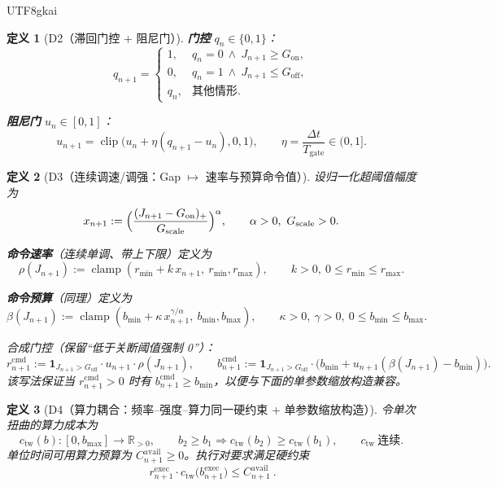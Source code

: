 \documentclass[12pt]{article}
\newtheorem{definition}{定义}[section]
\newcommand{\RR}{\mathbb{R}}
\newcommand{\indicator}[1]{\mathbf{1}_{#1}}
\newcommand{\clip}{\operatorname{clip}}
\newcommand{\clamp}{\operatorname{clamp}}
\begin{document}
\begin{CJK*}{UTF8}{gkai}
\begin{definition}[D2（滞回门控 + 阻尼门）]
\textbf{门控} $q_n\in\{0,1\}$：
\[
  q_{n+1}=
  \begin{cases}
    1,& q_n=0\ \wedge\ J_{n+1}\ge G_{\mathrm{on}},\\
    0,& q_n=1\ \wedge\ J_{n+1}\le G_{\mathrm{off}},\\
    q_n,& \text{其他情形}.
  \end{cases}
\]

\textbf{阻尼门} $u_n\in[0,1]$：
\[
  u_{n+1}=\clip\bigl(u_n+\eta(q_{n+1}-u_n),0,1\bigr),
  \qquad
  \eta=\frac{\Delta t}{T_{\mathrm{gate}}}\in(0,1].
\]
\end{definition}

\begin{definition}[D3（连续调速/调强：Gap $\mapsto$ 速率与预算命令值）]
\label{def:tex28-ch3-d3}
设归一化超阈值幅度为
\[
  x_{n+1}:=\Bigl(\frac{(J_{n+1}-G_{\mathrm{on}})_{+}}{G_{\mathrm{scale}}}\Bigr)^{\alpha},
  \qquad
  \alpha>0,\ G_{\mathrm{scale}}>0.
\]

\textbf{命令速率}（连续单调、带上下限）定义为
\[
  \rho(J_{n+1}):=\clamp(r_{\min}+k\,x_{n+1},\ r_{\min},r_{\max}),
  \qquad
  k>0,\ 0\le r_{\min}\le r_{\max}.
\]

\textbf{命令预算}（同理）定义为
\[
  \beta(J_{n+1}):=\clamp(b_{\min}+\kappa\,x_{n+1}^{\gamma/\alpha},\ b_{\min},b_{\max}),
  \qquad
  \kappa>0,\ \gamma>0,\ 0\le b_{\min}\le b_{\max}.
\]

合成门控（保留“低于关断阈值强制 0”）：
\[
  r^{\mathrm{cmd}}_{n+1}:=\indicator{J_{n+1}>G_{\mathrm{off}}}\cdot u_{n+1}\cdot \rho(J_{n+1}),
  \qquad
  b^{\mathrm{cmd}}_{n+1}:=\indicator{J_{n+1}>G_{\mathrm{off}}}\cdot\bigl(b_{\min}+u_{n+1}(\beta(J_{n+1})-b_{\min})\bigr)
    .
\]
该写法保证当 $r^{\mathrm{cmd}}_{n+1}>0$ 时有 $b^{\mathrm{cmd}}_{n+1}\ge b_{\min}$，以便与下面的单参数缩放构造兼容。
\end{definition}

\begin{definition}[D4（算力耦合：频率--强度--算力同一硬约束 + 单参数缩放构造）]
\label{def:tex28-ch3-d4}
令单次扭曲的算力成本为
\[
  c_{\mathrm{tw}}(b):[0,b_{\max}]\to\RR_{>0},
  \qquad
  b_2\ge b_1\Rightarrow c_{\mathrm{tw}}(b_2)\ge c_{\mathrm{tw}}(b_1),
  \qquad
  c_{\mathrm{tw}}\ \text{连续}.
\]
单位时间可用算力预算为 $C^{\mathrm{avail}}_{n+1}\ge 0$。执行对要求满足硬约束
\[
  \boxed{\ r^{\mathrm{exec}}_{n+1}\cdot c_{\mathrm{tw}}\!\bigl(b^{\mathrm{exec}}_{n+1}\bigr)\le C^{\mathrm{avail}}_{n+1}
    \ }.
\]


\end{definition}
\end{CJK*}
\end{document}
